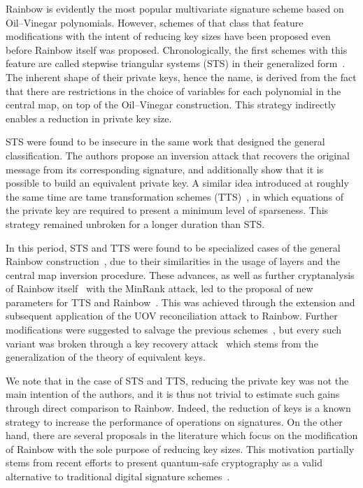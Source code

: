\documentclass[draft, 12pt, a4paper, oneside]{memoir}
\begin{document}
Rainbow is evidently the most popular multivariate signature scheme based on Oil--Vinegar polynomials. However, schemes of that class that feature modifications with the intent of reducing key sizes have been proposed even before Rainbow itself was proposed. Chronologically, the first schemes with this feature are called stepwise triangular systems (STS) in their generalized form~\cite{Wolf:200603}. The inherent shape of their private keys, hence the name, is derived from the fact that there are restrictions in the choice of variables for each polynomial in the central map, on top of the Oil--Vinegar construction. This strategy indirectly enables a reduction in private key size. 

STS were found to be insecure in the same work that designed the general classification. The authors propose an inversion attack that recovers the original message from its corresponding signature, and additionally show that it is possible to build an equivalent private key. A similar idea introduced at roughly the same time are tame transformation schemes (TTS)~\cite{}, in which equations of the private key are required to present a minimum level of sparseness. This strategy remained unbroken for a longer duration than STS. 

In this period, STS and TTS were found to be specialized cases of the general Rainbow construction~\cite{Ding:200806}, due to their similarities in the usage of layers and the central map inversion procedure. These advances, as well as further cryptanalysis of Rainbow itself~\cite{Billet:200609} with the MinRank attack, led to the proposal of new parameters for TTS and Rainbow~\cite{Ding:200806}. This was achieved through the extension and subsequent application of the UOV reconciliation attack to Rainbow. Further modifications were suggested to salvage the previous schemes~\cite{}, but every such variant was broken through a key recovery attack~\cite{Thomae:201207} which stems from the generalization of the theory of equivalent keys.


We note that in the case of STS and TTS, reducing the private key was not the main intention of the authors, and it is thus not trivial to estimate such gains through direct comparison to Rainbow. Indeed, the reduction of keys is a known strategy to increase the performance of operations on signatures. On the other hand, there are several proposals in the literature which focus on the modification of Rainbow with the sole purpose of reducing key sizes. This motivation partially stems from recent efforts to present quantum-safe cryptography as a valid alternative to traditional digital signature schemes~\cite{Bernstein:2008}.
\end{document}
